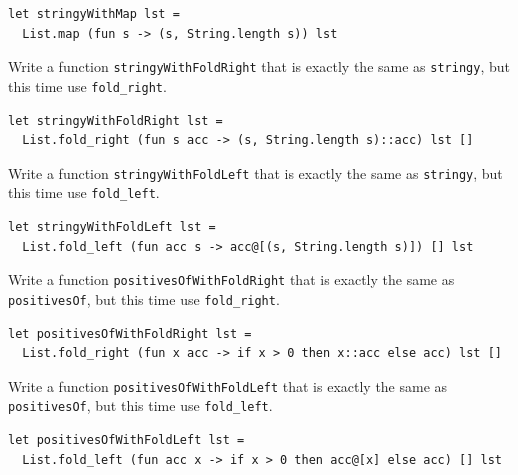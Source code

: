 \documentclass[addpoints]{exam}
\begin{document}
\begin{questions}
  \begin{solutionbox}{2cm}
    \begin{verbatim}
let stringyWithMap lst =
  List.map (fun s -> (s, String.length s)) lst
    \end{verbatim}
  \end{solutionbox}

  
  \question 
  Write a function \texttt{stringyWithFoldRight}
  that is exactly the same as \texttt{stringy},
  but this time use \texttt{fold\_right}.

  \begin{solutionbox}{2cm}
    \begin{verbatim}
let stringyWithFoldRight lst =
  List.fold_right (fun s acc -> (s, String.length s)::acc) lst []
    \end{verbatim}
  \end{solutionbox}

  
  \question 
  Write a function \texttt{stringyWithFoldLeft}
  that is exactly the same as \texttt{stringy},
  but this time use \texttt{fold\_left}.

  \begin{solutionbox}{2cm}
    \begin{verbatim}
let stringyWithFoldLeft lst =
  List.fold_left (fun acc s -> acc@[(s, String.length s)]) [] lst
    \end{verbatim}
  \end{solutionbox}

  
  \question 
  Write a function \texttt{positivesOfWithFoldRight}
  that is exactly the same as \texttt{positivesOf},
  but this time use \texttt{fold\_right}.

  \begin{solutionbox}{2cm}
    \begin{verbatim}
let positivesOfWithFoldRight lst =
  List.fold_right (fun x acc -> if x > 0 then x::acc else acc) lst []
    \end{verbatim}
  \end{solutionbox}

  
  \question 
  Write a function \texttt{positivesOfWithFoldLeft}
  that is exactly the same as \texttt{positivesOf},
  but this time use \texttt{fold\_left}.

  \begin{solutionbox}{2cm}
    \begin{verbatim}
let positivesOfWithFoldLeft lst =
  List.fold_left (fun acc x -> if x > 0 then acc@[x] else acc) [] lst
    \end{verbatim}
  \end{solutionbox}


\end{questions}
\end{document}
